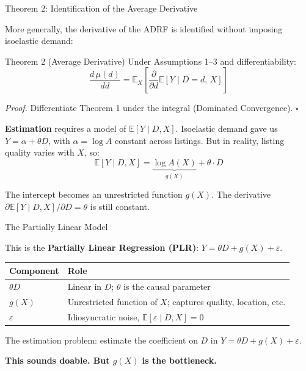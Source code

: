 \documentclass[aspectratio=169, 11pt]{beamer}
\newcommand{\E}{\mathbb{E}}
\begin{document}
\begin{frame}{Theorem 2: Identification of the Average Derivative}

More generally, the derivative of the ADRF is identified without imposing isoelastic demand:

\begin{block}{Theorem 2 (Average Derivative)}
Under Assumptions 1--3 and differentiability:
\[
\frac{d\,\mu(d)}{dd} = \E_X\!\left[\frac{\partial}{\partial d}\E[Y \mid D=d,\, X]\right]
\]
\end{block}

\textit{Proof.} Differentiate Theorem 1 under the integral (Dominated Convergence). $\square$

\bigskip
\pause

\textbf{Estimation} requires a model of $\E[Y \mid D, X]$. Isoelastic demand gave us $Y = \alpha + \theta D$, with $\alpha = \log A$ constant across listings. But in reality, listing quality varies with $X$, so:
\[
\E[Y \mid D, X] = \underbrace{\log A(X)}_{g(X)} + \theta \cdot D
\]

The intercept becomes an unrestricted function $g(X)$. The derivative $\partial \E[Y \mid D, X] / \partial D = \theta$ is still constant.

\end{frame}

\begin{frame}{The Partially Linear Model}

This is the \textbf{Partially Linear Regression (PLR)}: $Y = \theta D + g(X) + \varepsilon$.

\bigskip

\begin{center}
\begin{tabular}{ll}
\toprule
\textbf{Component} & \textbf{Role} \\
\midrule
$\theta D$ & Linear in $D$; $\theta$ is the causal parameter \\
$g(X)$ & Unrestricted function of $X$; captures quality, location, etc. \\
$\varepsilon$ & Idiosyncratic noise, $\E[\varepsilon \mid D, X] = 0$ \\
\bottomrule
\end{tabular}
\end{center}

\bigskip
\pause

The estimation problem: estimate the coefficient on $D$ in $Y = \theta D + g(X) + \varepsilon$.

\bigskip

\textbf{This sounds doable. But $g(X)$ is the bottleneck.} 

\end{frame}
\end{document}
